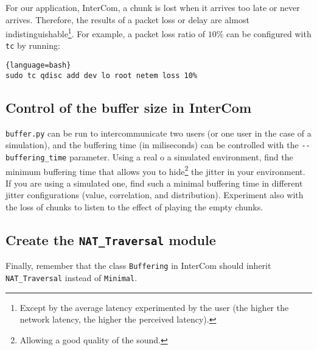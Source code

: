 For our application, InterCom, a chunk is lost when it arrives too
late or never arrives. Therefore, the results of a packet loss or delay are almost indistinguishable\footnote{Except by the
  average latency experimented by the user (the higher the network
  latency, the higher the perceived latency).}. For example, a packet
loss ratio of $10\%$ can be configured with \verb|tc| by running:

  \begin{lstlisting}{language=bash}
sudo tc qdisc add dev lo root netem loss 10%
  \end{lstlisting}

\subsection{Control of the buffer size in InterCom}
\label{sec:homework2}
\verb|buffer.py| can be run to intercommunicate two users (or one user
in the case of a simulation), and the buffering time (in miliseconds)
can be controlled with the \verb|--buffering_time| parameter. Using a
real o a simulated environment, find the minimum buffering time that
allows you to hide\footnote{Allowing a good quality of the sound.} the
jitter in your environment. If you are using a simulated one, find
such a minimal buffering time in different jitter configurations
(value, correlation, and distribution). Experiment also with the loss
of chunks to listen to the effect of playing the empty chunks.

\subsection{Create the \texttt{NAT\_Traversal} module}

Finally, remember that the class \texttt{Buffering} in InterCom should
inherit \texttt{NAT\_Traversal} instead of \texttt{Minimal}.


